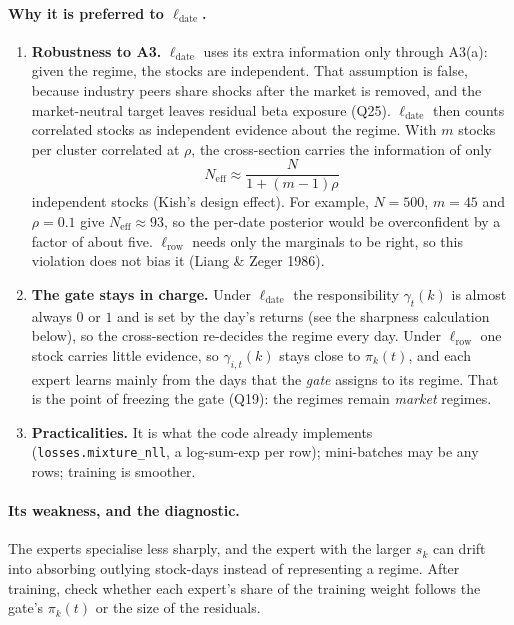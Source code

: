 \paragraph{Why it is preferred to $\ell_{\text{date}}$.}
\begin{enumerate}
  \item \textbf{Robustness to A3.} $\ell_{\text{date}}$ uses its extra information only through A3(a): given the regime, the stocks are independent. That assumption is false, because industry peers share shocks after the market is removed, and the market-neutral target leaves residual beta exposure (Q25). $\ell_{\text{date}}$ then counts correlated stocks as independent evidence about the regime. With $m$ stocks per cluster correlated at $\rho$, the cross-section carries the information of only
  \begin{equation*}
  N_{\text{eff}}\approx\frac{N}{1+(m-1)\rho}
  \end{equation*}
  independent stocks (Kish's design effect). For example, $N=500$, $m=45$ and $\rho=0.1$ give $N_{\text{eff}}\approx93$, so the per-date posterior would be overconfident by a factor of about five. $\ell_{\text{row}}$ needs only the marginals to be right, so this violation does not bias it (Liang \& Zeger 1986).
  \item \textbf{The gate stays in charge.} Under $\ell_{\text{date}}$ the responsibility $\gamma_t(k)$ is almost always $0$ or $1$ and is set by the day's returns (see the sharpness calculation below), so the cross-section re-decides the regime every day. Under $\ell_{\text{row}}$ one stock carries little evidence, so $\gamma_{i,t}(k)$ stays close to $\pi_k(t)$, and each expert learns mainly from the days that the \emph{gate} assigns to its regime. That is the point of freezing the gate (Q19): the regimes remain \emph{market} regimes.
  \item \textbf{Practicalities.} It is what the code already implements (\texttt{losses.mixture\_nll}, a log-sum-exp per row); mini-batches may be any rows; training is smoother.
\end{enumerate}

\paragraph{Its weakness, and the diagnostic.} The experts specialise less sharply, and the expert with the larger $s_k$ can drift into absorbing outlying stock-days instead of representing a regime. After training, check whether each expert's share of the training weight follows the gate's $\pi_k(t)$ or the size of the residuals.

